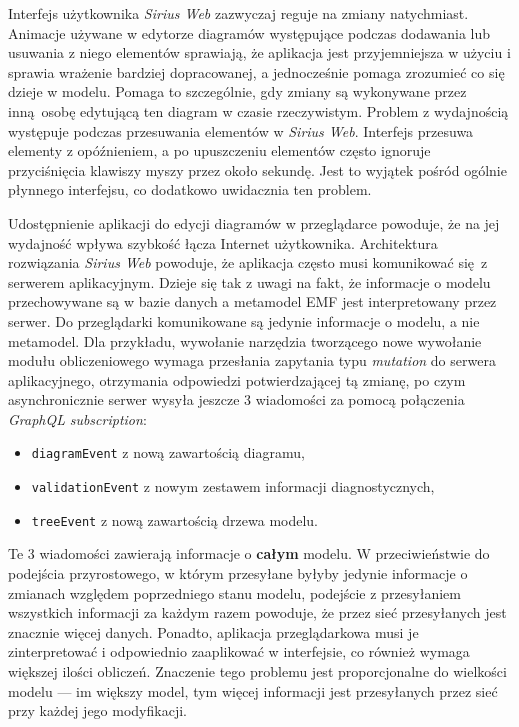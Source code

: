 Interfejs użytkownika \emph{Sirius Web} zazwyczaj reguje na zmiany natychmiast.
Animacje używane w edytorze diagramów występujące podczas dodawania lub
usuwania z niego elementów sprawiają, że aplikacja jest przyjemniejsza w użyciu
i sprawia wrażenie bardziej dopracowanej, a jednocześnie pomaga zrozumieć co
się dzieje w modelu. Pomaga to szczególnie, gdy zmiany są wykonywane przez
inną osobę edytującą ten diagram w czasie rzeczywistym.
Problem z wydajnością występuje podczas przesuwania elementów w \emph{Sirius
	Web}. Interfejs przesuwa elementy z opóźnieniem, a po upuszczeniu
elementów
często ignoruje przyciśnięcia klawiszy myszy przez około sekundę. Jest to
wyjątek pośród ogólnie płynnego interfejsu, co dodatkowo uwidacznia ten
problem.

Udostępnienie aplikacji do edycji diagramów w przeglądarce powoduje, że na
jej wydajność wpływa szybkość łącza Internet użytkownika. Architektura
rozwiązania \emph{Sirius Web} powoduje, że aplikacja często musi komunikować
się z serwerem aplikacyjnym. Dzieje się tak z uwagi na fakt, że informacje o
modelu przechowywane są w bazie danych a metamodel \gls{EMF} jest
interpretowany przez serwer. Do przeglądarki komunikowane są jedynie informacje
o modelu, a nie metamodel. Dla przykładu, wywołanie narzędzia tworzącego nowe
wywołanie modułu obliczeniowego wymaga przesłania zapytania typu
\emph{mutation} do serwera aplikacyjnego, otrzymania odpowiedzi potwierdzającej
tą zmianę, po czym asynchronicznie serwer wysyła jeszcze 3 wiadomości
za pomocą połączenia \emph{GraphQL} \emph{subscription}:

\begin{itemize}
	\item \texttt{diagramEvent} z nową zawartością diagramu,
	\item \texttt{validationEvent} z nowym zestawem informacji
	      diagnostycznych,
	\item \texttt{treeEvent} z nową zawartością drzewa modelu.
\end{itemize}

Te 3 wiadomości zawierają informacje o \textbf{całym} modelu. W przeciwieństwie
do podejścia przyrostowego, w którym przesyłane byłyby jedynie informacje o
zmianach względem poprzedniego stanu modelu, podejście z przesyłaniem
wszystkich informacji za każdym razem powoduje, że przez sieć przesyłanych jest
znacznie więcej danych. Ponadto, aplikacja przeglądarkowa musi je
zinterpretować i odpowiednio zaaplikować w interfejsie, co również wymaga
większej ilości obliczeń. Znaczenie tego problemu jest proporcjonalne do
wielkości modelu --- im większy model, tym więcej informacji jest przesyłanych
przez sieć przy każdej jego modyfikacji.

